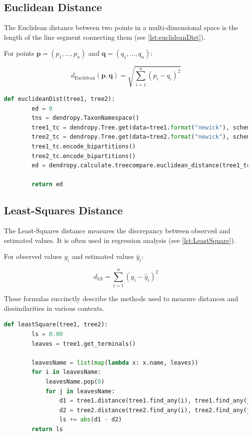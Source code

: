 \subsection{Euclidean Distance}\label{euclidean}
The Euclidean distance between two points in a multi-dimensional space is the length of the line segment connecting them (see \autoref{lst:euclideanDist}).

For points $\mathbf{p} = (p_1, \ldots, p_n)$ and $\mathbf{q} = (q_1, \ldots, q_n)$:

\begin{equation}
    d_{\text{Euclidean}}(\mathbf{p}, \mathbf{q}) = \sqrt{\sum_{i=1}^{n} (p_i - q_i)^2}
\end{equation}

\begin{lstlisting}[label=lst:euclideanDist,language=Python,caption=Python script for calculating the Euclidean distance using the ete3 package in the aPhyloGeo package]
    def euclideanDist(tree1, tree2):
        ed = 0
        tns = dendropy.TaxonNamespace()
        tree1_tc = dendropy.Tree.get(data=tree1.format("newick"), schema="newick", taxon_namespace=tns)
        tree2_tc = dendropy.Tree.get(data=tree2.format("newick"), schema="newick", taxon_namespace=tns)
        tree1_tc.encode_bipartitions()
        tree2_tc.encode_bipartitions()
        ed = dendropy.calculate.treecompare.euclidean_distance(tree1_tc, tree2_tc)

        return ed
\end{lstlisting}

\subsection{Least-Squares Distance}\label{LS}
The Least-Squares distance measures the discrepancy between observed and estimated values. It is often used in regression analysis (see \autoref{lst:LeastSquare}).

For observed values $y_i$ and estimated values $\hat{y}_i$:

\begin{equation}
    d_{\text{LS}} = \sum_{i=1}^{n} (y_i - \hat{y}_i)^2
\end{equation}

These formulas succinctly describe the methods used to measure distances and dissimilarities in various contexts.

\begin{lstlisting}[label=lst:LeastSquare,language=Python,caption=Python script for calculating the Least-Square distance using the ete3 package in the aPhyloGeo package]
    def leastSquare(tree1, tree2):
        ls = 0.00
        leaves = tree1.get_terminals()

        leavesName = list(map(lambda x: x.name, leaves))
        for i in leavesName:
            leavesName.pop(0)
            for j in leavesName:
                d1 = tree1.distance(tree1.find_any(i), tree1.find_any(j))
                d2 = tree2.distance(tree2.find_any(i), tree2.find_any(j))
                ls += abs(d1 - d2)
        return ls
\end{lstlisting}

